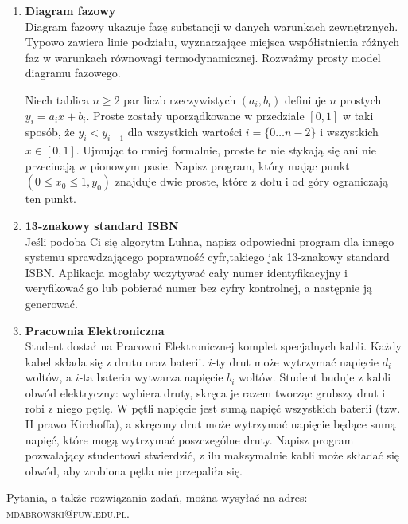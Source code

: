 \documentclass[12pt]{article}
\begin{document}
\begin{enumerate}
\newpage
{}

\item \textbf{Diagram fazowy}\\
Diagram fazowy ukazuje fazę substancji w danych warunkach zewnętrznych. Typowo zawiera linie podziału, wyznaczające miejsca współistnienia różnych faz w warunkach równowagi termodynamicznej. Rozważmy prosty model diagramu fazowego.

\vspace{0.2 cm}

Niech tablica $n\ge 2$ par liczb rzeczywistych $(a_i, b_i)$ definiuje $n$ prostych $y_i=a_i x+b_i$. Proste zostały uporządkowane w przedziale $[0,1]$ w taki sposób, że $y_i<y_{i+1}$ dla wszystkich wartości $i=\{0\dots n-2\}$ i wszystkich $x\in [0,1]$.
Ujmując to mniej formalnie, proste te nie stykają się ani nie przecinają w pionowym pasie. Napisz program, który mając punkt $(0\le x_0\le 1,y_0)$ znajduje dwie proste, które z dołu i od góry ograniczają ten punkt.

\item \textbf{13-znakowy standard ISBN}\\
Jeśli podoba Ci się algorytm Luhna, napisz odpowiedni program dla innego systemu sprawdzającego poprawność cyfr,takiego jak 13-znakowy standard ISBN. Aplikacja mogłaby wczytywać cały numer identyfikacyjny i weryfikować go lub pobierać numer bez cyfry kontrolnej, a następnie ją generować.

\item \textbf{Pracownia Elektroniczna}\\
Student dostał na Pracowni Elektronicznej komplet specjalnych kabli. Każdy kabel składa się z drutu oraz baterii. $i$-ty drut może wytrzymać napięcie $d_i$ woltów, a $i$-ta bateria wytwarza napięcie $b_i$ woltów. Student buduje z kabli obwód elektryczny: wybiera druty, skręca je razem tworząc grubszy drut i robi z niego pętlę. W pętli napięcie jest sumą napięć wszystkich baterii (tzw. II prawo Kirchoffa), a skręcony drut może wytrzymać napięcie będące sumą napięć, które mogą wytrzymać poszczególne druty. Napisz program pozwalający studentowi stwierdzić, z ilu maksymalnie kabli może składać się obwód, aby zrobiona pętla nie przepaliła się.


\end{enumerate}
\vspace{1cm}
\small Pytania, a także rozwiązania zadań, można wysyłać na adres: \textsc{mdabrowski@fuw.edu.pl}.
\end{document}
